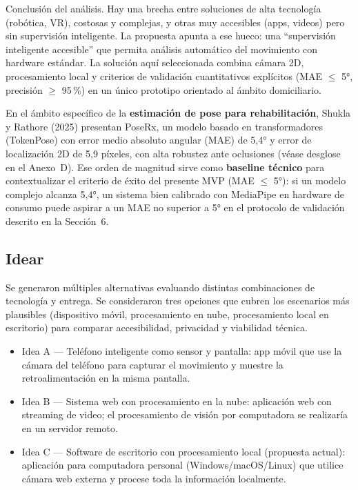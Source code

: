 \documentclass[11pt,a4paper]{article}
\begin{document}
Conclusión del análisis. Hay una brecha entre soluciones de alta tecnología (robótica, VR), costosas y complejas, y otras muy accesibles (apps, videos) pero sin supervisión inteligente. La propuesta apunta a ese hueco: una ``supervisión inteligente accesible'' que permita análisis automático del movimiento con hardware estándar. La solución aquí seleccionada combina cámara 2D, procesamiento local y criterios de validación cuantitativos explícitos (MAE $\leq$ 5°, precisión $\geq$ 95\,\%) en un único prototipo orientado al ámbito domiciliario.

En el ámbito específico de la \textbf{estimación de pose para rehabilitación}, Shukla y Rathore (2025) presentan PoseRx, un modelo basado en transformadores (TokenPose) con error medio absoluto angular (MAE) de 5,4° y error de localización 2D de 5,9 píxeles, con alta robustez ante oclusiones (véase desglose en el Anexo~D). Ese orden de magnitud sirve como \textbf{baseline técnico} para contextualizar el criterio de éxito del presente MVP (MAE $\leq$ 5°): si un modelo complejo alcanza 5,4°, un sistema bien calibrado con MediaPipe en hardware de consumo puede aspirar a un MAE no superior a 5° en el protocolo de validación descrito en la Sección~6.

\subsection{Idear}
Se generaron múltiples alternativas evaluando distintas combinaciones de tecnología y entrega. Se consideraron tres opciones que cubren los escenarios más plausibles (dispositivo móvil, procesamiento en nube, procesamiento local en escritorio) para comparar accesibilidad, privacidad y viabilidad técnica.

\begin{itemize}
  \item Idea A --- Teléfono inteligente como sensor y pantalla: app móvil que use la cámara del teléfono para capturar el movimiento y muestre la retroalimentación en la misma pantalla.
  \item Idea B --- Sistema web con procesamiento en la nube: aplicación web con streaming de video; el procesamiento de visión por computadora se realizaría en un servidor remoto.
  \item Idea C --- Software de escritorio con procesamiento local (propuesta actual): aplicación para computadora personal (Windows/macOS/Linux) que utilice cámara web externa y procese toda la información localmente.
\end{itemize}
\end{document}
